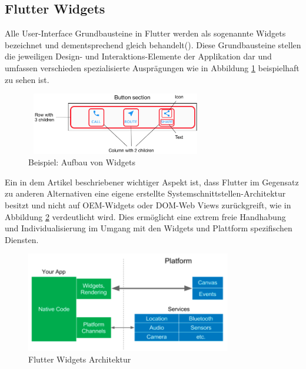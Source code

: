 \documentclass[bibliography=totoc,listof=totoc,BCOR=5mm,DIV=12,oneside]{scrbook}
\begin{document}
\subsection{Flutter Widgets}
\par Alle User-Interface Grundbausteine in Flutter werden als sogenannte Widgets bezeichnet und dementsprechend gleich behandelt(\cite[vgl. Everything’s a Widget]{Flu5}). Diese Grundbausteine stellen die jeweiligen Design- und Interaktions-Elemente der Applikation dar und umfassen verschieden spezialisierte Ausprägungen wie in Abbildung \ref{img:FlutterWidgetButtonSectionExample} beispielhaft zu sehen ist.

\begin{figure}[H]
	\centering
	\includegraphics[width=0.8\textwidth, keepaspectratio]{Bilder/FlutterWidgetButtonSectionExample.png}
	\caption{Beispiel: Aufbau von Widgets  \cite{FlutterBuildingLayouts}}
	\label{img:FlutterWidgetButtonSectionExample}
\end{figure}

\par \medskip Ein in dem Artikel \citep[Widgets]{HackernoonFlutterArcticle} beschriebener wichtiger Aspekt ist, dass Flutter im Gegensatz zu anderen Alternativen eine eigene erstellte Systemschnittstellen-Architektur besitzt und nicht auf OEM-Widgets oder DOM-Web Views zurückgreift, wie in Abbildung \ref{img:hackernoonFlutterArcticleArchitecture} verdeutlicht wird. Dies ermöglicht eine extrem freie Handhabung und Individualisierung im Umgang mit den Widgets und Plattform spezifischen Diensten.

\begin{figure}[H]
	\centering
	\includegraphics[width=0.8\textwidth, keepaspectratio]{Bilder/WidgetsFlutterArchitecture.png}
	\caption{Flutter Widgets Architektur \cite{HackernoonFlutterArcticle}}
	\label{img:hackernoonFlutterArcticleArchitecture}
\end{figure}
\end{document}
